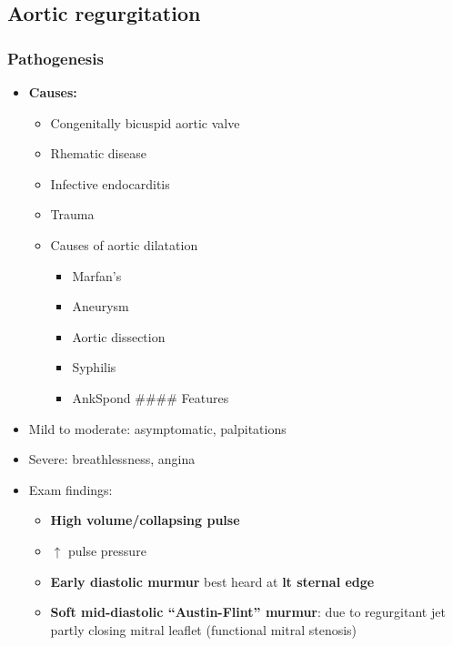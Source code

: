 \documentclass[
  12pt,
]{memoir}
\providecommand{\tightlist}{%
  \setlength{\itemsep}{0pt}\setlength{\parskip}{0pt}}
\begin{document}
\hypertarget{aortic-regurgitation}{%
\subsection{Aortic regurgitation}\label{aortic-regurgitation}}

\hypertarget{pathogenesis-8}{%
\subsubsection{Pathogenesis}\label{pathogenesis-8}}

\begin{itemize}
\tightlist
\item
  \textbf{Causes:}

  \begin{itemize}
  \tightlist
  \item
    Congenitally bicuspid aortic valve
  \item
    Rhematic disease
  \item
    Infective endocarditis
  \item
    Trauma
  \item
    Causes of aortic dilatation

    \begin{itemize}
    \tightlist
    \item
      Marfan's
    \item
      Aneurysm
    \item
      Aortic dissection
    \item
      Syphilis
    \item
      AnkSpond \#\#\#\# Features
    \end{itemize}
  \end{itemize}
\item
  Mild to moderate: asymptomatic, palpitations
\item
  Severe: breathlessness, angina
\item
  Exam findings:

  \begin{itemize}
  \tightlist
  \item
    \textbf{High volume/collapsing pulse}
  \item
    \(\uparrow\) pulse pressure
  \item
    \textbf{Early diastolic murmur} best heard at \textbf{lt sternal
    edge}
  \item
    \textbf{Soft mid-diastolic ``Austin-Flint'' murmur}: due to
    regurgitant jet partly closing mitral leaflet (functional mitral
    stenosis)
  \end{itemize}
\end{itemize}
\end{document}
